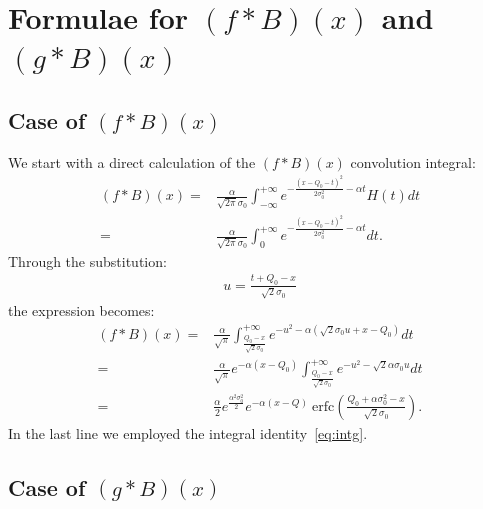 \documentclass[preprint,12pt]{elsarticle}
\begin{document}
\section{Formulae for $(f*B)(x)$ and $(g*B)(x)$}
\label{app:sr1}
%

\subsection*{Case of $(f*B)(x)$ }
%

We start with a direct calculation of the $(f*B)(x)$ convolution integral:
\begin{align}
(f*B)(x) = & \frac{\alpha}{\sqrt{2\pi}\sigma_0}   \int^{+\infty}_{-\infty} e^{ -\frac{(x-Q_0-t)^2}{2\sigma_0^2} -\alpha t } H(t) dt \nonumber \\
             = & \frac{\alpha}{\sqrt{2\pi}\sigma_0}  \int^{+\infty}_{0} e^{ -\frac{(x-Q_0-t)^2}{2\sigma_0^2} -\alpha t } dt.
\end{align}
Through the substitution:
\begin{align}
u = \frac{t+Q_0-x}{\sqrt{2}\sigma_0}  
\end{align}
the expression becomes:
\begin{align}
(f*B)(x) = & \frac{\alpha }{\sqrt{\pi}}   \int^{+\infty}_{ \frac{Q_0-x}{\sqrt{2}\sigma_0}   } e^{ -u^2 -\alpha( \sqrt{2}\sigma_0 u + x - Q_0 ) } dt \nonumber \\
            = & \frac{\alpha }{\sqrt{\pi}} e^{-\alpha(x-Q_0)} \int^{+\infty}_{ \frac{Q_0-x}{\sqrt{2}\sigma_0}   } e^{ -u^2 - \sqrt{2}\alpha\sigma_0 u  } dt  \nonumber \\
            = & \frac{\alpha }{2} e^{\frac{\alpha^2\sigma_0^2}{2}} e^{-\alpha(x-Q)} \ \text{erfc}\left(    \frac{Q_0 + \alpha\sigma_0^2 -x }{\sqrt{2}\sigma_0} \right).
\end{align}
In the last line we employed the integral identity~\eqref{eq:intg}. 


\subsection*{Case of $(g*B)(x)$ }
%
\end{document}
